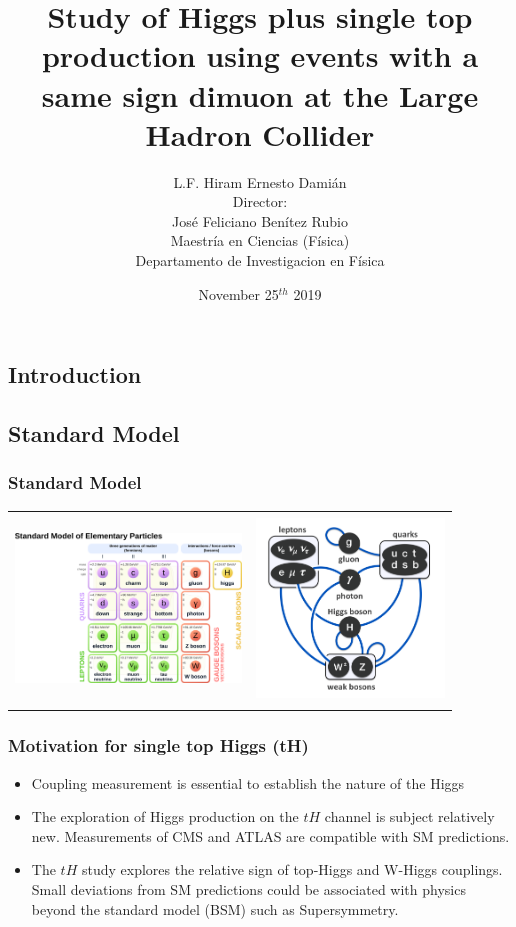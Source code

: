 \documentclass[11pt]{beamer}
\author{\tiny
   L.F. Hiram Ernesto Dami\'an\\
   \vspace{5px}
   Director:\\
   \vspace{5px}
   Jos\'e Feliciano Ben\'itez Rubio\\
   \vspace{5px}
   Maestr\'ia en Ciencias (F\'isica)\\
   \vspace{5px}
   Departamento de Investigacion en F\'isica }
\title{Study of Higgs plus single top production using events with a same sign dimuon  at the Large Hadron Collider}
\institute{Universidad de Sonora}
\date{\small November 25$^{th}$ 2019}
\begin{document}
\begin{frame}
\titlepage
\end{frame}

\begin{frame}
\tiny
\tableofcontents
\end{frame}


\begin{frame}
\section{Introduction}
\subsection{Standard Model}
\frametitle{Standard Model}
\begin{table}
	\centering
\begin{tabular}{cc}
\includegraphics[width=6cm,height=5cm]{figures/sm1.png} & \includegraphics[width=5cm,height=5cm]{figures/sm.png}
\end{tabular}
\end{table}
\end{frame}

\begin{frame}
\frametitle{Motivation  for single top Higgs (tH)}
\begin{itemize}
\item Coupling measurement is essential to establish the nature of the Higgs
\item The exploration of Higgs production on the $tH$ channel is subject relatively new. Measurements of CMS and ATLAS are compatible with SM predictions.
\item The $tH$ study explores the relative sign of top-Higgs  and W-Higgs couplings.\\ Small deviations from SM predictions could be associated with physics beyond the
standard model (BSM) such as Supersymmetry.
\end{itemize}
\end{frame}
\end{document}
